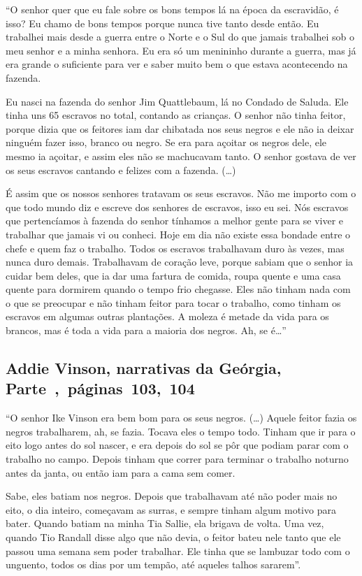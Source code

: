 ``O senhor quer que eu fale sobre os bons tempos lá na época da
escravidão, é isso? Eu chamo de bons tempos porque nunca tive tanto
desde então. Eu trabalhei mais desde a guerra entre o Norte e o Sul do
que jamais trabalhei sob o meu senhor e a minha senhora. Eu era só um
menininho durante a guerra, mas já era grande o suficiente para ver e
saber muito bem o que estava acontecendo na fazenda.

Eu nasci na fazenda do senhor Jim Quattlebaum, lá no Condado de Saluda.
Ele tinha uns 65 escravos no total, contando as crianças. O senhor não
tinha feitor, porque dizia que os feitores iam dar chibatada nos seus
negros e ele não ia deixar ninguém fazer isso, branco ou negro. Se era
para açoitar os negros dele, ele mesmo ia açoitar, e assim eles não se
machucavam tanto. O senhor gostava de ver os seus escravos cantando e
felizes com a fazenda. (\ldots{})

É assim que os nossos senhores tratavam os seus escravos. Não me importo
com o que todo mundo diz e escreve dos senhores de escravos, isso eu
sei. Nós escravos que pertencíamos à fazenda do senhor tínhamos a melhor
gente para se viver e trabalhar que jamais vi ou conheci. Hoje em dia
não existe essa bondade entre o chefe e quem faz o trabalho. Todos os
escravos trabalhavam duro às vezes, mas nunca duro demais. Trabalhavam
de coração leve, porque sabiam que o senhor ia cuidar bem deles, que ia
dar uma fartura de comida, roupa quente e uma casa quente para dormirem
quando o tempo frio chegasse. Eles não tinham nada com o que se
preocupar e não tinham feitor para tocar o trabalho, como tinham os
escravos em algumas outras plantações. A moleza é metade da vida para os
brancos, mas é toda a vida para a maioria dos negros. Ah, se é\ldots{}''

\subsection{Addie Vinson, narrativas da Geórgia, Parte~,~páginas~103,~104}
\label{ref269}

``O senhor Ike Vinson era bem bom para os seus negros. (\ldots{}) Aquele
feitor fazia os negros trabalharem, ah, se fazia. Tocava eles o tempo
todo. Tinham que ir para o eito logo antes do sol nascer, e era depois
do sol se pôr que podiam parar com o trabalho no campo. Depois tinham
que correr para terminar o trabalho noturno antes da janta, ou então iam
para a cama sem comer.

Sabe, eles batiam nos negros. Depois que trabalhavam até não poder mais
no eito, o dia inteiro, começavam as surras, e sempre tinham algum
motivo para bater. Quando batiam na minha Tia Sallie, ela brigava de
volta. Uma vez, quando Tio Randall disse algo que não devia, o feitor
bateu nele tanto que ele passou uma semana sem poder trabalhar. Ele
tinha que se lambuzar todo com o unguento, todos os dias por um tempão,
até aqueles talhos sararem''.

